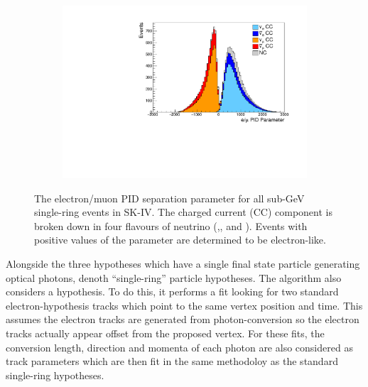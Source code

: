 \begin{figure}[h]
  \begin{subfigure}[t]{0.9\textwidth}
    \includegraphics[width=\textwidth, trim={0mm 0mm 0mm 0mm}, clip, page=1]{Figures/Selections/PIDParameter.pdf}
  \end{subfigure}
  \caption{The electron/muon PID separation parameter for all sub-GeV single-ring events in SK-IV. The charged current (CC) component is broken down in four flavours of neutrino (\quickmath{\nu_{\mu}},\quickmath{\bar{\nu}_{\mu}}, and ). Events with positive values of the parameter are determined to be electron-like.}
  \label{fig:Selection_EMUPIDParamDistribution}
\end{figure}

Alongside the three hypotheses which have a single final state particle generating optical photons, denoth ``single-ring'' particle hypotheses. The \fq algorithm also considers a  hypothesis. To do this, it performs a fit looking for two standard electron-hypothesis tracks which point to the same vertex position and time. This assumes the electron tracks are generated from photon-conversion so the electron tracks actually appear offset from the proposed  vertex. For these fits, the conversion length, direction and momenta of each photon are also considered as track parameters which are then fit in the same methodoloy as the standard single-ring hypotheses. 

